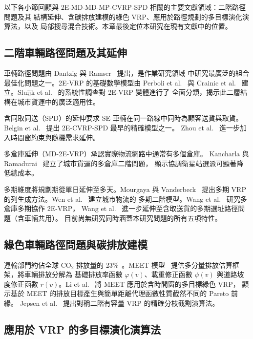 \documentclass[11pt, a4paper]{article}
\numberwithin{equation}{section}
\begin{document}
以下各小節回顧與 2E-MD-MD-MP-CVRP-SPD 相關的主要文獻領域：二階路徑問題及其
結構延伸、含碳排放建模的綠色 VRP、應用於路徑規劃的多目標演化演算法，以及
局部搜尋混合技術。本章最後定位本研究在現有文獻中的位置。

\subsection{二階車輛路徑問題及其延伸}

車輛路徑問題由 Dantzig 與 Ramser~\cite{dantzig1959} 提出，是作業研究領域
中研究最廣泛的組合最佳化問題之一。2E-VRP 的基礎數學模型由
Perboli et al.~\cite{perboli2011} 與 Crainic et al.~\cite{crainic2011}
建立。Sluijk et al.~\cite{sluijk2023} 的系統性調查對 2E-VRP 變體進行了
全面分類，揭示此二層結構在城市貨運中的廣泛適用性。

含同取同送（SPD）的延伸要求 SE 車輛在同一路線中同時為顧客送貨與取貨。
Belgin et al.~\cite{belgin2018} 提出 2E-CVRP-SPD 最早的精確模型之一。
Zhou et al.~\cite{zhou2022spd} 進一步加入時間窗約束與隨機需求延伸。

多倉庫延伸（MD-2E-VRP）承認實際物流網路中通常有多個倉庫。
Kancharla 與 Ramadurai~\cite{kancharla2019} 建立了城市貨運的多倉庫二階問題，
顯示協調衛星站選派可顯著降低總成本。

多期維度將規劃期從單日延伸至多天。Mourgaya 與 Vanderbeck~\cite{mourgaya2007}
提出多期 VRP 的列生成方法。Wen et al.~\cite{wen2010} 建立城市物流的
多期二階模型。Wang et al.~\cite{wang2021} 研究多倉庫多期協作 2E-VRP，
Wang et al.~\cite{wang2023} 進一步延伸至含取送貨的多期選址路徑問題（含車輛共用）。
目前尚無研究同時涵蓋本研究問題的所有五項特性。

\subsection{綠色車輛路徑問題與碳排放建模}

運輸部門約佔全球 CO$_2$ 排放量的 23\%~\cite{iea2022}。MEET
模型~\cite{hickman1999} 提供多分量排放估算框架，將車輛排放分解為
基礎排放率函數 $\varphi(v)$、載重修正函數 $\psi(v)$ 與道路坡度修正函數
$r(v)$。Li et al.~\cite{li2025} 將 MEET 應用於含時間窗的多目標綠色 VRP，
顯示基於 MEET 的排放目標產生與簡單距離代理函數性質截然不同的 Pareto 前緣。
Jepsen et al.~\cite{jepsen2013} 提出對稱二階有容量 VRP 的精確分枝截割演算法。

\subsection{應用於 VRP 的多目標演化演算法}
\end{document}
